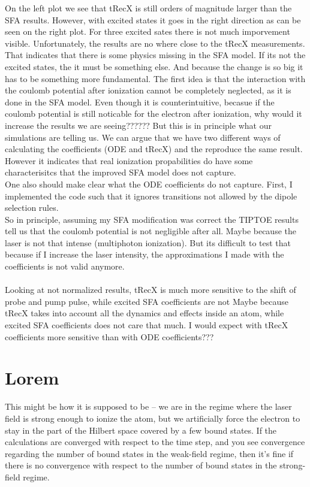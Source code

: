 On the left plot we see that tRecX is still orders of magnitude larger than the SFA results. 
However, with excited states it goes in the right direction as can be seen on the right plot. 
For three excited sates there is not much imporvement visible.
Unfortunately, the results are no where close to the tRecX measurements. That indicates that there is some physics missing in the SFA model.
If its not the excited states, the it must be something else.
And because the change is so big it has to be something more fundamental.
The first idea is that the interaction with the coulomb potential after ionization cannot be completely neglected, as it is done in the SFA model.
Even though it is counterintuitive, becasue if the coulomb potential is still noticable for the electron after ionization, why would it increase the results we are seeing??????
But this is in principle what our simulations are telling us. We can argue that we have two different ways of calculating the coefficients (ODE and tRecX) and the reproduce the same result.\\
However it indicates that real ionization propabilities do have some characterisitcs that the improved SFA model does not capture.\\
One also should make clear what the ODE coefficients do not capture. First, I implemented the code such that it ignores transitions not allowed by the dipole selection rules.\\
So in principle, assuming my SFA modification was correct the TIPTOE results tell us that the coulomb potential is not negligible after all. 
Maybe because the laser is not that intense (multiphoton ionization).
But its difficult to test that because if I increase the laser intensity, the approximations I made with the coefficients is not valid anymore.\\\\

Looking at not normalized results, tRecX is much more sensitive to the shift of probe and pump pulse, while excited SFA coefficients are not
Maybe because tRecX takes into account all the dynamics and effects inside an atom, while excited SFA coefficients does not care that much.
I would expect with tRecX coefficients more sensitive than with ODE coefficients???




\section{Lorem}
This might be how it is supposed to be -- we are in the regime where the laser field is strong enough to ionize the atom, 
but we artificially force the electron to stay in the part of the Hilbert space covered by a few bound states. 
If the calculations are converged with respect to the time step, and you see convergence regarding the number of bound states in the weak-field regime, 
then it's fine if there is no convergence with respect to the number of bound states in the strong-field regime.




